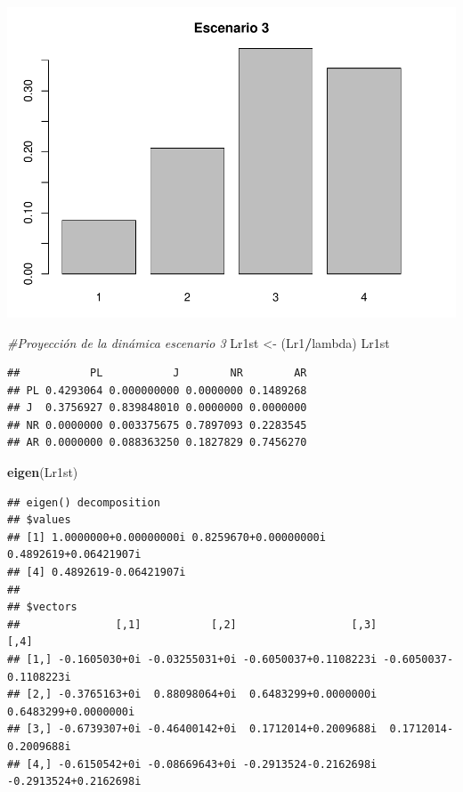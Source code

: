 \documentclass[
]{book}
\newenvironment{Shaded}{\begin{snugshade}}{\end{snugshade}}
\newcommand{\CommentTok}[1]{\textcolor[rgb]{0.56,0.35,0.01}{\textit{#1}}}
\newcommand{\FunctionTok}[1]{\textcolor[rgb]{0.13,0.29,0.53}{\textbf{#1}}}
\newcommand{\NormalTok}[1]{#1}
\newcommand{\OtherTok}[1]{\textcolor[rgb]{0.56,0.35,0.01}{#1}}
\newcommand{\SpecialCharTok}[1]{\textcolor[rgb]{0.81,0.36,0.00}{\textbf{#1}}}
\theoremstyle{definition}
\theoremstyle{definition}
\theoremstyle{definition}
\theoremstyle{definition}
\theoremstyle{remark}
\begin{document}
\includegraphics{Diagnostico_Poblacional_files/figure-latex/chap10_4-5.pdf}

\begin{Shaded}
\begin{Highlighting}[]
\CommentTok{\#Proyección de la dinámica escenario 3 }
\NormalTok{Lr1st }\OtherTok{\textless{}{-}}\NormalTok{ (Lr1}\SpecialCharTok{/}\NormalTok{lambda)}
\NormalTok{Lr1st}
\end{Highlighting}
\end{Shaded}

\begin{verbatim}
##           PL           J        NR        AR
## PL 0.4293064 0.000000000 0.0000000 0.1489268
## J  0.3756927 0.839848010 0.0000000 0.0000000
## NR 0.0000000 0.003375675 0.7897093 0.2283545
## AR 0.0000000 0.088363250 0.1827829 0.7456270
\end{verbatim}

\begin{Shaded}
\begin{Highlighting}[]
\FunctionTok{eigen}\NormalTok{(Lr1st)}
\end{Highlighting}
\end{Shaded}

\begin{verbatim}
## eigen() decomposition
## $values
## [1] 1.0000000+0.00000000i 0.8259670+0.00000000i 0.4892619+0.06421907i
## [4] 0.4892619-0.06421907i
## 
## $vectors
##               [,1]           [,2]                  [,3]                  [,4]
## [1,] -0.1605030+0i -0.03255031+0i -0.6050037+0.1108223i -0.6050037-0.1108223i
## [2,] -0.3765163+0i  0.88098064+0i  0.6483299+0.0000000i  0.6483299+0.0000000i
## [3,] -0.6739307+0i -0.46400142+0i  0.1712014+0.2009688i  0.1712014-0.2009688i
## [4,] -0.6150542+0i -0.08669643+0i -0.2913524-0.2162698i -0.2913524+0.2162698i
\end{verbatim}
\end{document}
